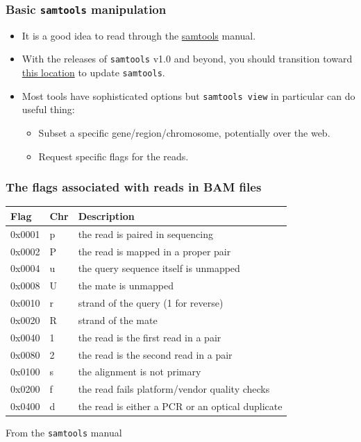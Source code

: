 \documentclass{beamer}
\begin{document}
\begin{frame}
  \frametitle{Basic \texttt{samtools} manipulation}
  \begin{itemize}
  \item It is a good idea to read through the \href{http://samtools.sourceforge.net/samtools.shtml}{samtools} manual.
  \item With the releases of \texttt{samtools} v1.0 and beyond, you should transition toward \href{http://www.htslib.org/}{this location} to update \texttt{samtools}.
  \item Most tools have sophisticated options but \texttt{samtools view} in particular can do useful thing:
    \begin{itemize}
    \item Subset a specific gene/region/chromosome, potentially over the web.
    \item Request specific flags for the reads.
    \end{itemize}
  \end{itemize}
\end{frame}


\begin{frame}
  \frametitle{The flags associated with reads in BAM files}
  \begin{tabular}{lll}
    Flag &       Chr &    Description\\
    \hline
    0x0001   &   p  &     the read is paired in sequencing\\
    0x0002   &   P  &     the read is mapped in a proper pair\\
    0x0004   &   u  &     the query sequence itself is unmapped\\
    0x0008   &   U  &     the mate is unmapped\\
    0x0010   &   r  &     strand of the query (1 for reverse)\\
    0x0020   &   R  &     strand of the mate\\
    0x0040   &   1  &     the read is the first read in a pair\\
    0x0080   &   2  &     the read is the second read in a pair\\
    0x0100   &   s  &     the alignment is not primary\\
    0x0200   &   f  &     the read fails platform/vendor quality checks\\
    0x0400   &   d  &     the read is either a PCR or an optical duplicate
  \end{tabular}
      {\tiny From the \texttt{samtools} manual}
\end{frame}
\end{document}
